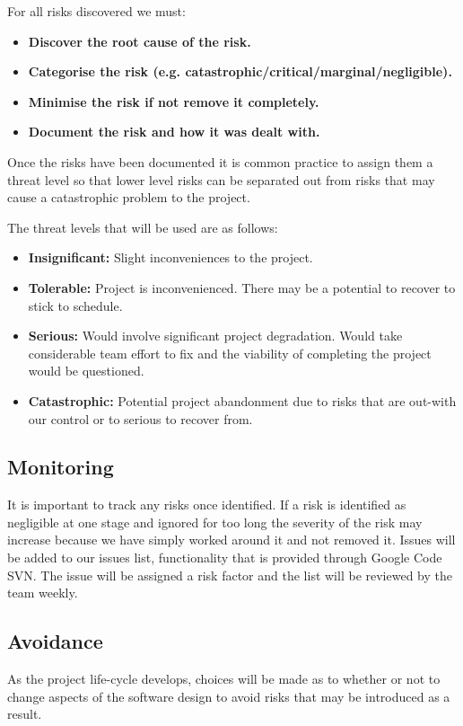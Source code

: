 \documentclass{l3proj}
\begin{document}
For all risks discovered we must:
\begin{itemize}
\item{\textbf{Discover the root cause of the risk.}}
\item{\textbf{Categorise the risk (e.g. catastrophic/critical/marginal/negligible).}}
\item{\textbf{Minimise the risk if not remove it completely.}}
\item{\textbf{Document the risk and how it was dealt with.}}
\end{itemize}

Once the risks have been documented it is common practice to assign them a threat level so that lower level risks can be separated out from risks that may cause a catastrophic problem to the project.

The threat levels that will be used are as follows:
\begin{itemize}
\item{\textbf{Insignificant:} Slight inconveniences to the project.}
\item{\textbf{Tolerable:} Project is inconvenienced. There may be a potential to recover to stick to schedule.}
\item{\textbf{Serious:} Would involve significant project degradation. Would take considerable team effort to fix and the viability of completing the project would be questioned.}
\item{\textbf{Catastrophic:} Potential project abandonment due to risks that are out-with our control or to serious to recover from.}
\end{itemize}


\subsection{Monitoring}
It is important to track any risks once identified. If a risk is identified as negligible at one stage and ignored for too long the severity of the risk may increase because we have simply worked around it and not removed it. Issues will be added to our issues list, functionality that is provided through Google Code SVN. The issue will be assigned a risk factor and the list will be reviewed by the team weekly.

\subsection{Avoidance}
As the project life-cycle develops, choices will be made as to whether or not to change aspects of the software design to avoid risks that may be introduced as a result. 
\end{document}
